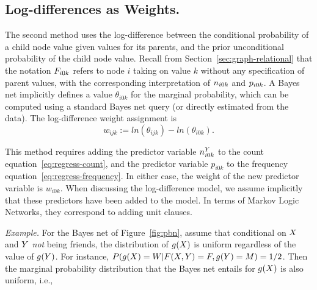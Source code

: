 \documentclass[twoside,leqno,twocolumn]{article}
\begin{document}
\subsection{Log-differences as Weights.} \label{sec:log-diff}
The second method uses the log-difference between the conditional probability of a child node value given values for its parents, and the prior unconditional probability of the child node value. Recall from Section~\ref{sec:graph-relational} that the notation $F_{i0k}$ refers to node $i$ taking on value $k$ without any specification of parent values, with the corresponding interpretation of $n_{i0k}$ and $p_{i0k}$.
A Bayes net implicitly defines a value $\theta_{i0k}$ for the marginal probability, which can be computed using a standard Bayes net query (or directly estimated from the data).
%
%
The log-difference weight assignment is 
\begin{equation*}
w_{ijk} := ln(\theta_{ijk}) - ln(\theta_{i0k}).
\end{equation*}

This method requires adding the predictor variable $n^{Y}_{i0k}$ to the count equation~\ref{eq:regress-count}, and the predictor variable $p_{i0k}$ to the frequency equation~\ref{eq:regress-frequency}. In either case, the weight of the new predictor variable is $w_{i0k}$.
 When discussing the log-difference model, we assume  implicitly that these predictors have been added to the model. In terms of 
Markov Logic Networks, they correspond to adding unit clauses. 

{\em Example.} For the Bayes net of Figure~\ref{fig:pbn}, assume that conditional on $X$ and $Y$ {\em not} being friends, the distribution of $g(X)$ is  uniform regardless of the value of $g(Y)$. For instance, $P(g(X)=W|F(X,Y) = F, g(Y) = M) = 1/2$. Then the marginal probability distribution that the Bayes net entails for $g(X)$ is also uniform, i.e.,
\end{document}
